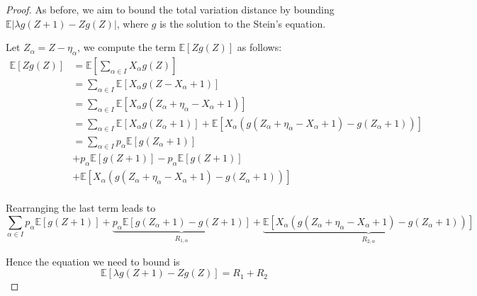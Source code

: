 \documentclass{article}
\begin{document}
\begin{proof}

    As before, we aim to bound the total variation distance by bounding $\mathbb{E}|\lambda g(Z+1) - Zg(Z)|$, where $g$ is the solution to the Stein's equation.  

    Let $Z_\alpha = Z - \eta_\alpha$, we compute the term $\mathbb{E}[Zg(Z)]$ as follows:  
    \begin{align*}
        \mathbb{E}[Zg(Z)] &= \mathbb{E}[\sum_{\alpha \in I} X_\alpha g(Z)]\\
        &= \sum_{\alpha \in I} \mathbb{E}[X_\alpha g(Z - X_\alpha + 1)]\\
        &= \sum_{\alpha \in I} \mathbb{E}[X_\alpha g(Z_\alpha + \eta_\alpha -X_\alpha +  1)]\\
        &= \sum_{\alpha \in I} \mathbb{E}[X_\alpha g(Z_\alpha + 1)] + \mathbb{E}[X_\alpha (g(Z_\alpha + \eta_\alpha -X_\alpha +  1) - g(Z_\alpha + 1))]\\
        &= \sum_{\alpha \in I} p_\alpha \mathbb{E}[g(Z_\alpha + 1)] \\
        &+ p_\alpha \mathbb{E}[g(Z+1)] - p_\alpha \mathbb{E}[g(Z+1)] \\
        &+ \mathbb{E}[X_\alpha (g(Z_\alpha + \eta_\alpha -X_\alpha +  1) - g(Z_\alpha + 1))] \\
    \end{align*}

    Rearranging the last term leads to 
    \[\sum_{\alpha \in I} p_\alpha \mathbb{E}[g(Z + 1)] + \underbrace{p_\alpha \mathbb{E}[g(Z_\alpha+1) - g(Z+1)]}_{R_{1,\alpha}} + \underbrace{\mathbb{E}[X_\alpha (g(Z_\alpha + \eta_\alpha -X_\alpha +  1) - g(Z_\alpha + 1))]}_{R_{2, \alpha}}\] 

    Hence the equation we need to bound is
    \begin{equation*}
        \mathbb{E}[\lambda g(Z+1) - Zg(Z)] =  R_1 + R_2
    \end{equation*}


\end{proof}
\end{document}
